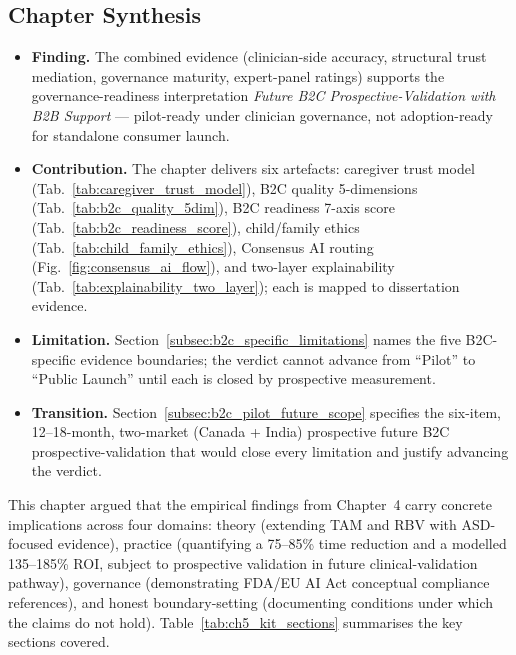 \subsection{Chapter Synthesis}
\label{subsec:ch5_synthesis}

\begin{itemize}[leftmargin=*, itemsep=2pt]
    \item \textbf{Finding.} The combined evidence (clinician-side accuracy, structural trust mediation, governance maturity, expert-panel ratings) supports the governance-readiness interpretation \emph{Future B2C Prospective-Validation with B2B Support} --- pilot-ready under clinician governance, not adoption-ready for standalone consumer launch.
    \item \textbf{Contribution.} The chapter delivers six artefacts: caregiver trust model (Tab.~\ref{tab:caregiver_trust_model}), B2C quality 5-dimensions (Tab.~\ref{tab:b2c_quality_5dim}), B2C readiness 7-axis score (Tab.~\ref{tab:b2c_readiness_score}), child/family ethics (Tab.~\ref{tab:child_family_ethics}), Consensus AI routing (Fig.~\ref{fig:consensus_ai_flow}), and two-layer explainability (Tab.~\ref{tab:explainability_two_layer}); each is mapped to dissertation evidence.
    \item \textbf{Limitation.} Section~\ref{subsec:b2c_specific_limitations} names the five B2C-specific evidence boundaries; the verdict cannot advance from ``Pilot'' to ``Public Launch'' until each is closed by prospective measurement.
    \item \textbf{Transition.} Section~\ref{subsec:b2c_pilot_future_scope} specifies the six-item, 12--18-month, two-market (Canada + India) prospective future B2C prospective-validation that would close every limitation and justify advancing the verdict.
\end{itemize}



This chapter argued that the empirical findings from Chapter~4 carry concrete implications across four domains: theory (extending TAM and RBV with ASD-focused evidence), practice (quantifying a 75--85\% time reduction and a modelled 135--185\% ROI, subject to prospective validation in future clinical-validation pathway), governance (demonstrating FDA/EU AI Act conceptual compliance references), and honest boundary-setting (documenting conditions under which the claims do not hold). Table~\ref{tab:ch5_kit_sections} summarises the key sections covered.

